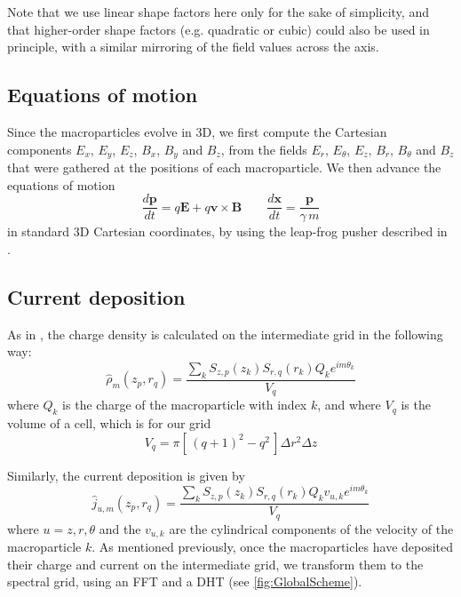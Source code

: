 \documentclass[1p,times]{elsarticle}
\renewcommand{\vec}[1]{\boldsymbol{#1}}
\begin{document}
Note that we use linear shape factors here only for
the sake of simplicity, and that higher-order shape factors
(e.g. quadratic or cubic) could also be used in principle, with
a similar mirroring of the field values across the axis.
 

\subsection{Equations of motion}
\label{sec:eq-motion}

Since the macroparticles evolve in 3D, we first compute
the Cartesian components $E_x$, $E_y$, $E_z$, $B_x$, $B_y$ and
$B_z$, from the fields $E_r$, $E_\theta$, $E_z$, $B_r$, $B_\theta$ and
$B_z$ that were gathered at the positions of each macroparticle. 
We then advance the equations of motion
\begin{equation} \frac{d\vec{p}}{dt} = q\vec{E} + q\vec{v}\times \vec{B} \qquad
\frac{d\vec{x}}{dt} = \frac{\vec{p}}{\gamma \,m} \end{equation}
\noindent  in standard 3D Cartesian coordinates, by using the leap-frog pusher described in \citep{VayPoP2008}.

\subsection{Current deposition}
\label{sec:current-deposition}

As in \citep{Lifschitz}, the charge density is calculated on the intermediate grid in the
following way:
\begin{equation} \hat{\rho}_m(z_p,r_q) = \frac{ \sum_k  S_{z,p}(z_k)S_{r,q}(r_k) Q_k e^{im\theta_k}}{V_{q}} \end{equation}
where $Q_k$ is the charge of the macroparticle with index $k$, and
where $V_q$ is the volume of a cell, which is for our grid
\begin{equation} V_{q} = \pi [\, (q+1)^2- q^2\,] \Delta r^2 \Delta z \end{equation}

\noindent Similarly, the current deposition is given by
\begin{equation} \hat{j}_{u,m}(z_p,r_q) = \frac{\sum_k S_{z,p}(z_k) S_{r,q}(r_k)
Q_k v_{u,k} e^{im\theta_k}}{V_{q}} \end{equation}
where $u = z,r,\theta$ and the $v_{u,k}$ are the cylindrical components of the
velocity of the macroparticle $k$. As mentioned previously, once the
macroparticles have deposited their charge and current on the
intermediate grid, we transform them to the spectral grid, using an
FFT and a DHT (see \cref{fig:GlobalScheme}).
\end{document}
